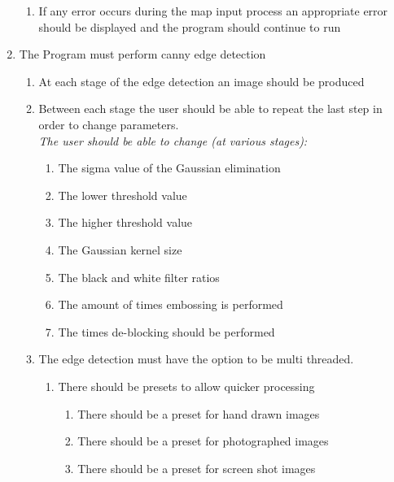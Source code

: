 \begin{FlushLeft}
\begin{enumerate}
\begin{enumerate}
                \item If any error occurs during the map input process an appropriate error should be displayed and the program should continue to run
            \end{enumerate}

            \item The Program must perform canny edge detection   
            \begin{enumerate}
                \item At each stage of the edge detection an image should be produced
                \begin{enumerate}
                \end{enumerate}
                \item Between each stage the user should be able to repeat the last step in order to change parameters.\\
                \emph{The user should be able to change (at various stages):} 
                \begin{enumerate}
                    \item The sigma value of the Gaussian elimination
                    \item The lower threshold value
                    \item The higher threshold value
                    \item The Gaussian kernel size
                    \item The black and white filter ratios
                    \item The amount of times embossing is performed
                    \item The times de-blocking should be performed
                \end{enumerate}
                \item The edge detection must have the option to be multi threaded.
                \begin{enumerate}
                    \item There should be presets to allow quicker processing
                    \begin{enumerate}
                        \item There should be a preset for hand drawn images
                        \item There should be a preset for photographed images
                        \item There should be a preset for screen shot images
                    \end{enumerate}
                \end{enumerate}
                

\end{enumerate}
\end{enumerate}
\end{FlushLeft}
